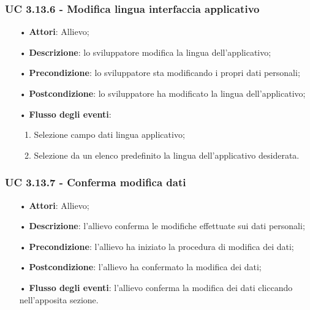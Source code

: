 \subsubsection{UC 3.13.6 - Modifica lingua interfaccia applicativo}
\begin{itemize}
	\item[•]\textbf{Attori}: Allievo;
	\item[•]\textbf{Descrizione}: lo sviluppatore modifica la lingua dell'applicativo;
	\item[•]\textbf{Precondizione}: lo sviluppatore sta modificando i propri dati personali;
	\item[•]\textbf{Postcondizione}: lo sviluppatore ha modificato la lingua dell'applicativo; 
	\item[•]\textbf{Flusso degli eventi}: 
	\begin{enumerate}
		\item Selezione campo dati lingua applicativo;
		\item Selezione da un elenco predefinito la lingua dell'applicativo desiderata.
	\end{enumerate}
\end{itemize}

\subsubsection{UC 3.13.7 - Conferma modifica dati}
\begin{itemize}
\item[•]\textbf{Attori}: Allievo;
\item[•]\textbf{Descrizione}: l'allievo conferma le modifiche effettuate sui dati personali;
\item[•]\textbf{Precondizione}: l'allievo ha iniziato la procedura di modifica dei dati;
\item[•]\textbf{Postcondizione}: l'allievo ha confermato la modifica dei dati;
\item[•]\textbf{Flusso degli eventi}: l'allievo conferma la modifica dei dati cliccando nell'apposita sezione.
\end{itemize}

